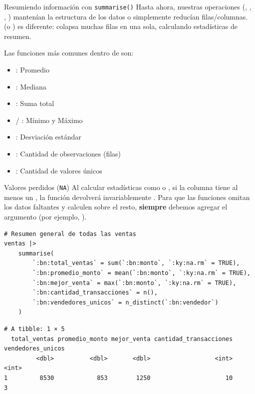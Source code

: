 \documentclass[8pt]{beamer}
\begin{document}
\begin{frame}[fragile]{Resumiendo información con \texttt{summarise()}}
Hasta ahora, nuestras operaciones (, , , ) mantenían la estructura de los datos o simplemente reducían filas/columnas.  (o ) es diferente: colapsa muchas filas en una sola, calculando estadísticas de resumen.

Las funciones más comunes dentro de  son:
\begin{itemize}
	\item {}: Promedio
	\item {}: Mediana
	\item {}: Suma total
	\item {} / : Mínimo y Máximo
	\item {}: Desviación estándar
	\item {}: Cantidad de observaciones (filas)
	\item {}: Cantidad de valores únicos
\end{itemize}
\end{frame}



\begin{frame}[fragile]
\begin{alertblock}{Valores perdidos (\texttt{NA})}
Al calcular estadísticas como  o , si la columna tiene al menos un , la función devolverá invariablemente . Para que las funciones omitan los datos faltantes y calculen sobre el resto, \textbf{siempre} debemos agregar el argumento  (por ejemplo, ).
\end{alertblock}

\begin{lstlisting}[style=RScript]
# Resumen general de todas las ventas
ventas |>
	summarise(
		`:bn:total_ventas` = sum(`:bn:monto`, `:ky:na.rm` = TRUE),
		`:bn:promedio_monto` = mean(`:bn:monto`, `:ky:na.rm` = TRUE),
		`:bn:mejor_venta` = max(`:bn:monto`, `:ky:na.rm` = TRUE),
		`:bn:cantidad_transacciones` = n(),
		`:bn:vendedores_unicos` = n_distinct(`:bn:vendedor`)
	)
\end{lstlisting}
\begin{lstlisting}[style=RConsole]
# A tibble: 1 × 5
  total_ventas promedio_monto mejor_venta cantidad_transacciones vendedores_unicos
         <dbl>          <dbl>       <dbl>                  <int>             <int>
1         8530            853        1250                     10                 3
\end{lstlisting}
\end{frame}
\end{document}
